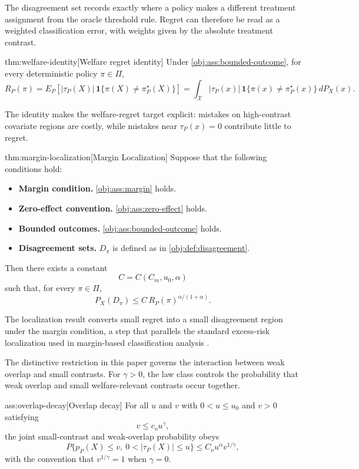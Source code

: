 The disagreement set records exactly where a policy makes a different treatment assignment from the oracle threshold rule.  Regret can therefore be read as a weighted classification error, with weights given by the absolute treatment contrast.

\begin{theoremv}{thm:welfare-identity}[Welfare regret identity]
Under \cref{obj:ass:bounded-outcome}, for every deterministic policy \(\pi\in\Pi\),
\[
R_P(\pi)
=
E_P\!\left[
|\tau_P(X)|\,\mathbf 1\{\pi(X)\ne\pi^\star_P(X)\}
\right]
=
\int_{\mathcal X}
|\tau_P(x)|\,\mathbf 1\{\pi(x)\ne\pi^\star_P(x)\}\,dP_X(x).
\]
\end{theoremv}

The identity makes the welfare-regret target explicit: mistakes on high-contrast covariate regions are costly, while mistakes near \(\tau_P(x)=0\) contribute little to regret.

\begin{theoremv}{thm:margin-localization}[Margin Localization]
Suppose that the following conditions hold:
\begin{itemize}
\item \textbf{Margin condition.} \cref{obj:ass:margin} holds.
\item \textbf{Zero-effect convention.} \cref{obj:ass:zero-effect} holds.
\item \textbf{Bounded outcomes.} \cref{obj:ass:bounded-outcome} holds.
\item \textbf{Disagreement sets.} \(D_\pi\) is defined as in \cref{obj:def:disagreement}.
\end{itemize}
Then there exists a constant
\[
C=C(C_m,u_0,\alpha)
\]
such that, for every \(\pi\in\Pi\),
\[
P_X(D_\pi)
\le
C\,R_P(\pi)^{\alpha/(1+\alpha)} .
\]
\end{theoremv}

The localization result converts small regret into a small disagreement region under the margin condition, a step that parallels the standard excess-risk localization used in margin-based classification analysis \citep{Audibert2007,Massart2006,Tsybakov2009}.

The distinctive restriction in this paper governs the interaction between weak overlap and small contrasts.  For \(\gamma>0\), the law class controls the probability that weak overlap and small welfare-relevant contrasts occur together.

\begin{assumptionv}{ass:overlap-decay}[Overlap decay]
For all \(u\) and \(v\) with \(0<u\le u_0\) and \(v>0\) satisfying
\[
v\le c_o u^\gamma,
\]
the joint small-contrast and weak-overlap probability obeys
\[
P\{p_P(X)\le v,\ 0<|\tau_P(X)|\le u\}
   \le C_o u^\alpha v^{1/\gamma},
\]
with the convention that \(v^{1/\gamma}=1\) when \(\gamma=0\).
\end{assumptionv}

